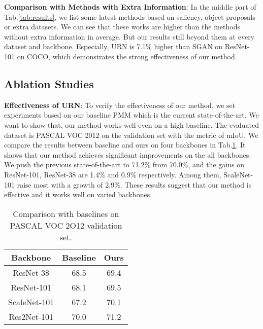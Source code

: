 \noindent \textbf{Comparison with Methods with Extra Information}: In the middle part of Tab.\ref{tab:results}, we list some latest methods based on saliency, object proposals or extra datasets. We can see that these works are higher than the methods without extra information in average. But our results still beyond them at every dataset and backbone. Especially, URN is 7.1\% higher than SGAN on ResNet-101 on COCO, which demonstrates the strong effectiveness of our method.


\subsection{Ablation Studies}
\textbf{Effectiveness of URN}:
To verify the effectiveness of our method, we set experiments based on our baseline PMM which is the current state-of-the-art. We want to show that, our method works well even on a high baseline. The evaluated dataset is PASCAL VOC 2012 on the validation set with the metric of mIoU. We compare the results between baseline and ours on four backbones in Tab.\ref{tab:baseline}. It shows that our method achieves significant improvements on the all backbones. We push the previous state-of-the-art to 71.2\% from 70.0\%, and the gains on ResNet-101, ResNet-38 are 1.4\% and 0.9\% respectively. Among them, ScaleNet-101 raise most with a growth of 2.9\%. These results suggest that our method is effective and it works well on varied backbones.

\begin{table}[ht]
\begin{centering}
\setlength\tabcolsep{15pt}
\begin{tabular}{ccc}
\hline 
Backbone  & Baseline  & Ours\tabularnewline
\hline 
\hline 
ResNet-38  & 68.5  & 69.4\tabularnewline
ResNet-101  & 68.1  & 69.5\tabularnewline
ScaleNet-101  & 67.2  & 70.1\tabularnewline
Res2Net-101  & 70.0  & 71.2\tabularnewline
\hline 
\end{tabular}
\par\end{centering}
\caption{\label{tab:baseline}Comparison with baselines on PASCAL VOC 2O12 validation set.}
\end{table}

